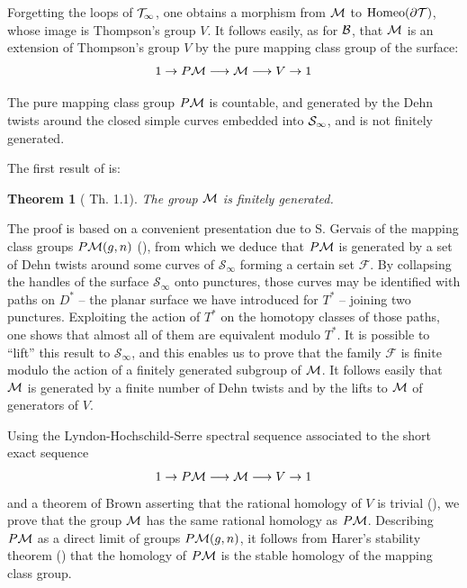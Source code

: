 \documentclass[twoside]{irmaems}
\theoremstyle{plain}
\newtheorem{theorem}{Theorem}[section]
\theoremstyle{definition}
\theoremstyle{remark}
\begin{document}
\vspace{0.1cm}\noindent 
Forgetting the loops of ${\cal T}_{\infty}$, one obtains a morphism from ${\cal M}$ to ${\rm Homeo}(\partial {\cal T})$, whose image is Thompson's group $V$.
It follows easily, as for ${\cal B}$, that ${\cal M}$ is an extension of Thompson's group $V$ by the 
pure mapping class group of the surface:
$$1\rightarrow P{\cal M}\longrightarrow {\cal M}\longrightarrow V\rightarrow 1$$

\vspace{0.1cm}\noindent
The pure mapping class group $P{\cal M}$ is countable, and generated by the Dehn twists 
around the closed simple curves embedded into  ${\cal S}_{\infty}$, and is not finitely generated.


\vspace{0.1cm}\noindent 
The first result of \cite{fu-ka3} is:


\begin{theorem}[ \cite{fu-ka3} Th. 1.1]
 The group ${\cal M}$  is finitely generated.
\end{theorem}

\vspace{0.1cm}\noindent 
The proof is based on a convenient presentation due to  S. Gervais of the mapping class groups $P{\cal M}(g,n)$ (\cite{ge}), from which we deduce that
$P{\cal M}$ is generated by a set of Dehn twists around some curves of ${\mathscr{S}}_{\infty}$ 
forming a certain set $\mathscr{F}$. By collapsing the handles of the surface ${\mathscr{S}}_{\infty}$ onto punctures, 
those curves may be identified with paths on $D^*$ -- the planar surface we have introduced for $T^*$ -- joining two punctures. 
Exploiting the action of $T^*$ on the homotopy classes of those paths, one shows that almost all of them are equivalent modulo $T^*$. 
It is possible to ``lift'' this result to ${\mathscr{S}}_{\infty}$,  and this enables us to prove that 
the family $\mathscr{F}$ is finite modulo the action of a finitely  generated subgroup of ${\cal M}$. It follows 
easily that ${\cal M}$ is generated by a finite number of Dehn twists and by the lifts to ${\cal M}$ of generators 
of $V$.

\vspace{0.1cm}\noindent 
Using the Lyndon-Hochschild-Serre spectral sequence associated to the short exact sequence 
\[1\rightarrow P{\cal M}\longrightarrow {\cal M}\longrightarrow V\rightarrow 1\]
and a theorem of Brown asserting that the rational homology of $V$ is trivial (\cite{br2}), we prove that the group ${\cal M}$ has the same rational homology as 
$P{\cal M}$. Describing $P{\cal M}$ as a direct limit of groups $P{\cal M}(g,n)$, 
it follows from Harer's stability theorem  (\cite{ha}) that the homology of $P{\cal M}$ is the stable homology 
of the mapping class group.
\end{document}
